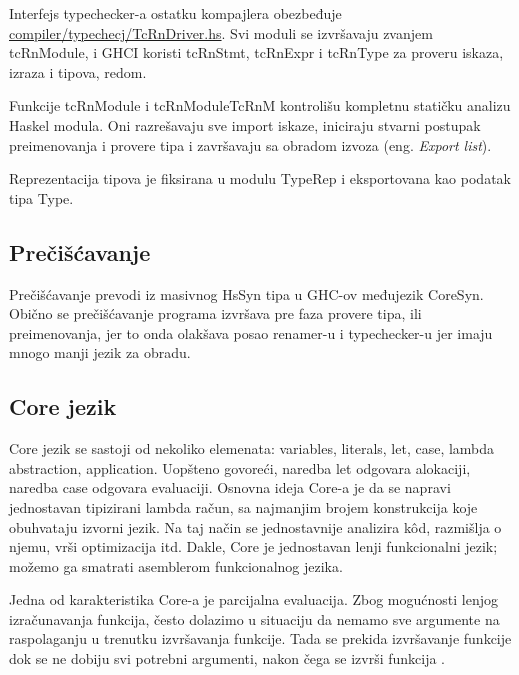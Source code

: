 Interfejs typechecker-a ostatku kompajlera obezbeđuje \\ \underline{compiler/typechecj/TcRnDriver.hs}. Svi moduli se izvršavaju zvanjem tcRnModule, i GHCI koristi tcRnStmt, tcRnExpr 
i tcRnType za proveru iskaza, izraza i tipova, redom.

Funkcije tcRnModule i tcRnModuleTcRnM kontrolišu kompletnu statičku analizu Haskel modula. Oni razrešavaju sve import iskaze, iniciraju stvarni postupak preimenovanja i provere tipa i završavaju sa obradom izvoza (eng. \emph{Export list}).

Reprezentacija tipova je fiksirana u modulu TypeRep i eksportovana kao podatak tipa Type.

\subsection{Prečišćavanje}
\label{subsec:podnaslovDesugar}

Prečišćavanje prevodi iz masivnog HsSyn tipa u GHC-ov međujezik CoreSyn. Obično se prečišćavanje programa izvršava pre faza provere tipa, ili preimenovanja, jer to onda olakšava posao renamer-u i typechecker-u jer imaju mnogo manji jezik za obradu.

\subsection{Core jezik}
\label{subsec:podnaslovCore}

Core jezik se sastoji od nekoliko elemenata: variables, literals, let, case, lambda abstraction, application. 
Uopšteno govoreći, naredba let odgovara alokaciji, naredba case odgovara evaluaciji.
Osnovna ideja Core-a je da se napravi jednostavan tipizirani lambda račun, sa najmanjim brojem konstrukcija koje obuhvataju izvorni jezik. Na taj način se jednostavnije analizira k\^{o}d, razmišlja o njemu, vrši optimizacija itd.
Dakle, Core je jednostavan lenji funkcionalni jezik; možemo ga smatrati asemblerom funkcionalnog jezika.

Jedna od karakteristika Core-a je parcijalna evaluacija. Zbog mogućnosti lenjog izračunavanja funkcija, često dolazimo u situaciju da nemamo sve argumente na raspolaganju u trenutku izvršavanja funkcije. Tada se prekida izvršavanje funkcije dok se ne dobiju svi potrebni argumenti, nakon čega se izvrši funkcija \cite{Launchbury}. 

